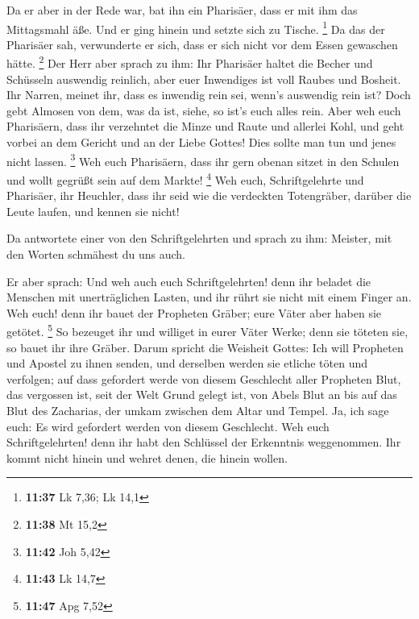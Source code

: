 Da er aber in der Rede war, bat ihn ein Pharisäer, dass er
mit ihm das Mittagsmahl äße. Und er ging hinein und setzte sich zu
Tische. \footnote{\textbf{11:37} Lk 7,36; Lk 14,1}  Da das
der Pharisäer sah, verwunderte er sich, dass er sich nicht vor dem Essen
gewaschen hätte. \footnote{\textbf{11:38} Mt 15,2}  Der
Herr aber sprach zu ihm: Ihr Pharisäer haltet die Becher und Schüsseln
auswendig reinlich, aber euer Inwendiges ist voll Raubes und Bosheit.
 Ihr Narren, meinet ihr, dass es inwendig rein sei, wenn's
auswendig rein ist?  Doch gebt Almosen von dem, was da ist,
siehe, so ist's euch alles rein.  Aber weh euch Pharisäern,
dass ihr verzehntet die Minze und Raute und allerlei Kohl, und geht
vorbei an dem Gericht und an der Liebe Gottes! Dies sollte man tun und
jenes nicht lassen. \footnote{\textbf{11:42} Joh 5,42}  Weh
euch Pharisäern, dass ihr gern obenan sitzet in den Schulen und wollt
gegrüßt sein auf dem Markte! \footnote{\textbf{11:43} Lk 14,7}
 Weh euch, Schriftgelehrte und Pharisäer, ihr Heuchler,
dass ihr seid wie die verdeckten Totengräber, darüber die Leute laufen,
und kennen sie nicht!

 Da antwortete einer von den Schriftgelehrten und sprach zu
ihm: Meister, mit den Worten schmähest du uns auch.

 Er aber sprach: Und weh auch euch Schriftgelehrten! denn
ihr beladet die Menschen mit unerträglichen Lasten, und ihr rührt sie
nicht mit einem Finger an.  Weh euch! denn ihr bauet der
Propheten Gräber; eure Väter aber haben sie getötet. \footnote{\textbf{11:47}
  Apg 7,52}  So bezeuget ihr und williget in eurer Väter
Werke; denn sie töteten sie, so bauet ihr ihre Gräber. 
Darum spricht die Weisheit Gottes: Ich will Propheten und Apostel zu
ihnen senden, und derselben werden sie etliche töten und verfolgen;
 auf dass gefordert werde von diesem Geschlecht aller
Propheten Blut, das vergossen ist, seit der Welt Grund gelegt ist,
 von Abels Blut an bis auf das Blut des Zacharias, der
umkam zwischen dem Altar und Tempel. Ja, ich sage euch: Es wird
gefordert werden von diesem Geschlecht.  Weh euch
Schriftgelehrten! denn ihr habt den Schlüssel der Erkenntnis
weggenommen. Ihr kommt nicht hinein und wehret denen, die hinein wollen.

